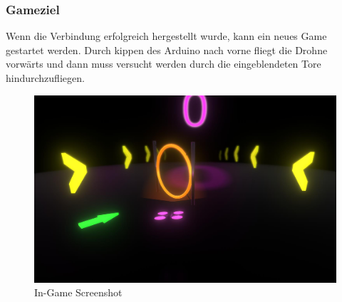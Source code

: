 \newpage
\subsubsection{Gameziel}
Wenn die Verbindung erfolgreich hergestellt wurde, kann ein neues Game gestartet werden. Durch kippen des Arduino nach vorne fliegt die Drohne vorwärts und dann muss versucht werden durch die eingeblendeten Tore hindurchzufliegen.
\begin{figure}[H]
  \begin{center}
    \includegraphics[width=0.6\linewidth]{content/images/game.jpg}
    \caption{In-Game Screenshot}
  \end{center}
\end{figure}